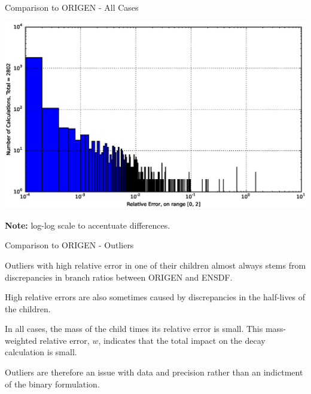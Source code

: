\documentclass[xcolor=x11names,compress]{beamer}
\begin{document}
\begin{frame}{Comparison to ORIGEN - All Cases}

    \begin{center}
    \includegraphics[scale=0.45]{decay-relative-error-histogram.eps}
    \end{center}

    \vspace*{-1em}
    \textbf{Note:} log-log scale to accentuate differences.

\end{frame}


\begin{frame}{Comparison to ORIGEN - Outliers}

    Outliers with high relative error in one of their children almost always
    stems from discrepancies in branch ratios between ORIGEN and ENSDF.

    \vspace*{1em}
    High relative errors are also sometimes caused by discrepancies in the 
    half-lives of the children.

    \vspace*{1em}
    In all cases, the mass of the child times its relative error is small.
    This mass-weighted relative error, $w$,  indicates that the total impact 
    on the decay calculation is small.

    \vspace*{1em}
    Outliers are therefore an issue with data and precision rather than 
    an indictment of the binary formulation.

\end{frame}
\end{document}
